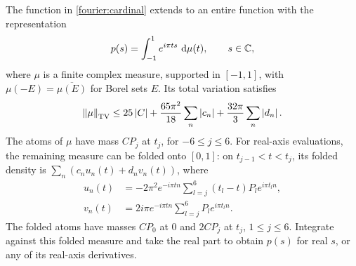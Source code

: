 \begin{lemma}\label{fourier:measure-lemma}
The function in \eqref{fourier:cardinal} extends to an entire function with
the representation
\begin{equation}\label{fourier:measure}
 p(s)=\int_{-1}^{1}e^{i\pi ts}\,\mathop{}\!\mathrm d\mu(t),\qquad s\in\mathbb C,
\end{equation}
where \(\mu\) is a finite complex measure, supported in \([-1,1]\), with
\(\mu(-E)=\overline{\mu(E)}\) for Borel sets \(E\).
Its total variation satisfies
\begin{equation}\label{fourier:variation}
 \left\lVert\mu\right\rVert_{\mathrm{TV}}
 \le25\left\lvert C\right\rvert+\frac{65\pi^2}{18}\sum_n\left\lvert c_n\right\rvert
                 +\frac{32\pi}{3}\sum_n\left\lvert d_n\right\rvert.
\end{equation}
The atoms of \(\mu\) have mass \(CP_j\) at \(t_j\), for \(-6\le j\le6\).
For real-axis evaluations, the remaining measure can be folded onto
\([0,1]\): on \(t_{j-1}<t<t_j\), its folded density is
\(\sum_n(c_nu_n(t)+d_nv_n(t))\), where
\begin{equation}\label{fourier:folded}
 \begin{split}
 u_n(t)&=-2\pi^2e^{-i\pi tn}
              \sum_{l=j}^{6}(t_l-t)P_l e^{i\pi t_ln},\\
 v_n(t)&=2i\pi e^{-i\pi tn}
              \sum_{l=j}^{6}P_l e^{i\pi t_ln}.
 \end{split}
\end{equation}
The folded atoms have masses \(CP_0\) at \(0\) and \(2CP_j\) at \(t_j\),
\(1\le j\le6\).  Integrate against this folded measure and take the real
part to obtain \(p(s)\) for real \(s\), or any of its real-axis derivatives.
\end{lemma}

